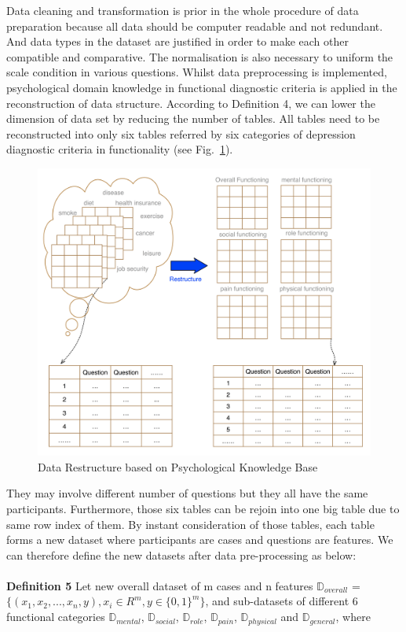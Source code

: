 \documentclass[runningheads]{llncs}
\begin{document}
Data cleaning and transformation is prior in the whole procedure of data preparation because all data should be computer readable and not redundant. And data types in the dataset are justified in order to make each other compatible and comparative. The normalisation is also necessary to uniform the scale condition in various questions. Whilst data preprocessing is implemented, psychological domain knowledge in functional diagnostic criteria is applied in the reconstruction of data structure. According to Definition 4, we can lower the dimension of data set by reducing the number of tables. All tables need to be reconstructed into only six tables referred by six categories of depression diagnostic criteria in functionality (see Fig.~\ref{fig3}).
\begin{figure}[h]
\includegraphics[width=1\textwidth]{restructure.png}
\caption{Data Restructure based on Psychological Knowledge Base} \label{fig3}
\end{figure}
They may involve different number of questions but they all have the same participants. Furthermore, those six tables can be rejoin into one big table due to same row index of them. By instant consideration of those tables, each table forms a new dataset where participants are cases and questions are features. We can therefore define the new datasets after data pre-processing as below:\\
\\
\textbf{Definition 5} Let new overall dataset of m cases and n features $\mathbb{D}_{overall}$ = $\displaystyle \big\{ (x_{1}, x_{2}, ... , x_{n}, y ), x_{i} \in R^{m}, y \in {\{0, 1\}}^{m}  \big\}$, and sub-datasets of different 6 functional categories $\mathbb{D}_{mental}$, $\mathbb{D}_{social}$, $\mathbb{D}_{role}$, $\mathbb{D}_{pain}$, $\mathbb{D}_{physical}$ and $\mathbb{D}_{general}$, where
\end{document}
